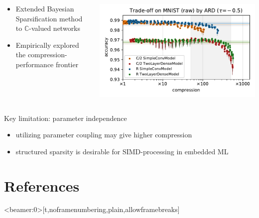 \documentclass{beamer}
\newcommand{\cplx}{\mathbb{C}}
\begin{document}
\begin{frame}[c]{\insertsection}
  \begin{columns}[T]
    \begin{column}{0.38\textwidth}
      \begin{itemize}
        \item Extended Bayesian Sparsification method to $\cplx$-valued networks
        \item Empirically explored the compression-performance frontier
      \end{itemize}
    \end{column}
    \begin{column}{0.58\textwidth}
      \includegraphics[scale=0.35,clip]{figure__mnist-like__trade-off/appendix__cmp__ARD__mnist__raw__-0.5.pdf}
    \end{column}
  \end{columns}

  \bigskip
  Key limitation: parameter independence %
  \begin{itemize}
    \item utilizing parameter coupling may give higher compression
    \item structured sparsity is desirable for SIMD-processing in embedded ML
  \end{itemize}

\end{frame}


\section{References} %
\label{sec:references}

\begin{frame}<beamer:0>[t,noframenumbering,plain,allowframebreaks]{\insertsection}
  \tiny
  
  
\end{frame}

\end{document}
